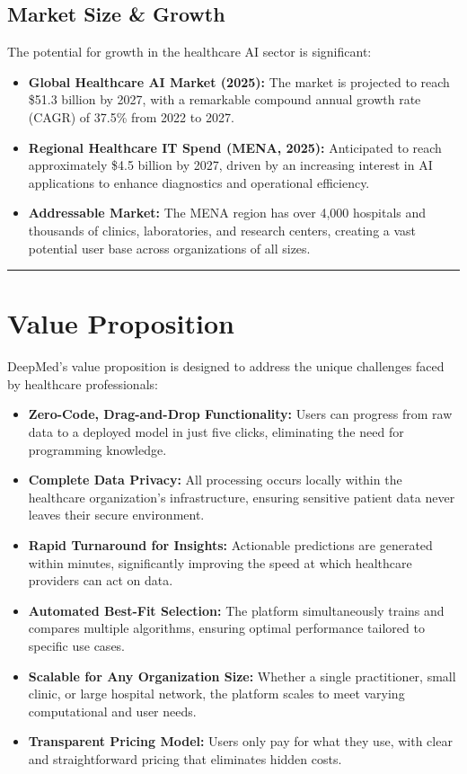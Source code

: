 \documentclass[11pt,a4paper]{article}
\begin{document}
\subsection{Market Size \& Growth}
The potential for growth in the healthcare AI sector is significant:
\begin{itemize}
  \item \textbf{Global Healthcare AI Market (2025):} The market is projected to reach \$51.3 billion by 2027, with a remarkable compound annual growth rate (CAGR) of 37.5\% from 2022 to 2027.
  \item \textbf{Regional Healthcare IT Spend (MENA, 2025):} Anticipated to reach approximately \$4.5 billion by 2027, driven by an increasing interest in AI applications to enhance diagnostics and operational efficiency.
  \item \textbf{Addressable Market:} The MENA region has over 4,000 hospitals and thousands of clinics, laboratories, and research centers, creating a vast potential user base across organizations of all sizes.
\end{itemize}

\bigskip\hrule\bigskip

\section{Value Proposition}
DeepMed's value proposition is designed to address the unique challenges faced by healthcare professionals:
\begin{itemize}
  \item \textbf{Zero-Code, Drag-and-Drop Functionality:} Users can progress from raw data to a deployed model in just five clicks, eliminating the need for programming knowledge.
  \item \textbf{Complete Data Privacy:} All processing occurs locally within the healthcare organization's infrastructure, ensuring sensitive patient data never leaves their secure environment.
  \item \textbf{Rapid Turnaround for Insights:} Actionable predictions are generated within minutes, significantly improving the speed at which healthcare providers can act on data.
  \item \textbf{Automated Best-Fit Selection:} The platform simultaneously trains and compares multiple algorithms, ensuring optimal performance tailored to specific use cases.
  \item \textbf{Scalable for Any Organization Size:} Whether a single practitioner, small clinic, or large hospital network, the platform scales to meet varying computational and user needs.
  \item \textbf{Transparent Pricing Model:} Users only pay for what they use, with clear and straightforward pricing that eliminates hidden costs.
\end{itemize}
\end{document}
